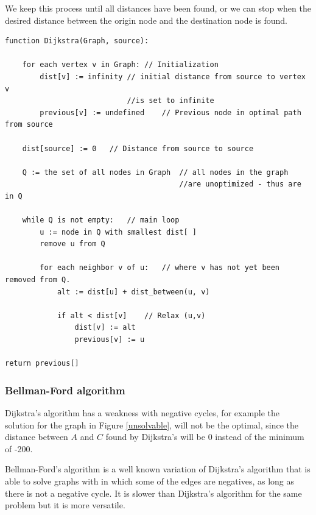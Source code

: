 We keep this process until all distances have been found, or we can stop when the desired distance between the origin node and the destination node is found.

\begin{verbatim}
function Dijkstra(Graph, source):

    for each vertex v in Graph:	// Initialization
        dist[v] := infinity	// initial distance from source to vertex v 
                            //is set to infinite
        previous[v] := undefined	// Previous node in optimal path from source
        
    dist[source] := 0	// Distance from source to source
    
    Q := the set of all nodes in Graph	// all nodes in the graph
                                        //are unoptimized - thus are in Q
    
    while Q is not empty:	// main loop
        u := node in Q with smallest dist[ ]
        remove u from Q
        
        for each neighbor v of u:	// where v has not yet been removed from Q.
            alt := dist[u] + dist_between(u, v)
            
            if alt < dist[v]	// Relax (u,v)
                dist[v] := alt
                previous[v] := u
                
return previous[]
\end{verbatim}

\subsubsection{Bellman-Ford algorithm}

Dijkstra's algorithm has a weakness with negative cycles, for example the solution for the graph in Figure \ref{unsolvable}, will not be the optimal, since the distance between $A$ and $C$ found by Dijkstra's will be 0 instead of the minimum of -200.

Bellman-Ford's algorithm is a well known variation of Dijkstra's algorithm that is able to solve graphs with in which some of the edges are negatives, as long as there is not a negative cycle. It is slower than Dijkstra's algorithm for the same problem but it is more versatile.

